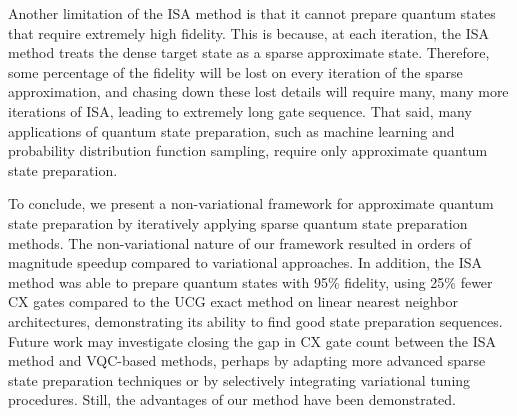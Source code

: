 \documentclass{article}
\begin{document}
Another limitation of the ISA method is that it cannot prepare quantum states
that require extremely high fidelity. This is because, at each iteration, the
ISA method treats the dense target state as a sparse approximate state.
Therefore, some percentage of the fidelity will be lost on every iteration of
the sparse approximation, and chasing down these lost details will require many,
many more iterations of ISA, leading to extremely long gate sequence. That said,
many applications of quantum state preparation, such as machine learning and 
probability distribution function sampling, require only approximate quantum
state preparation.

To conclude, we present a non-variational framework for approximate quantum 
state preparation by iteratively applying sparse quantum state preparation
methods. The non-variational nature of our framework resulted in orders of
magnitude speedup compared to variational approaches. In addition, the ISA
method was able to prepare quantum states with 95\% fidelity, using 25\% 
fewer CX gates compared to the UCG exact method on linear nearest neighbor 
architectures, demonstrating its ability to find good state preparation 
sequences. Future work may investigate closing the gap in CX gate count between
the ISA method and VQC-based methods, perhaps by adapting more advanced sparse
state preparation techniques or by selectively integrating variational tuning
procedures. Still, the advantages of our method have been demonstrated.



\end{document}
